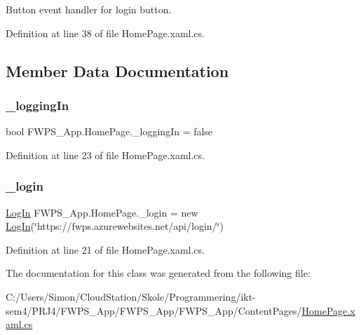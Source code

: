 Button event handler for login button. 



Definition at line 38 of file Home\+Page.\+xaml.\+cs.



\subsection{Member Data Documentation}
\mbox{\label{class_f_w_p_s___app_1_1_home_page_aa4738baf0c1037a3550fe73c0a700610}} 
\subsubsection{\texorpdfstring{\+\_\+logging\+In}{\_loggingIn}}
{\footnotesize\ttfamily bool F\+W\+P\+S\+\_\+\+App.\+Home\+Page.\+\_\+logging\+In = false\hspace{0.3cm}{\ttfamily [private]}}



Definition at line 23 of file Home\+Page.\+xaml.\+cs.

\mbox{\label{class_f_w_p_s___app_1_1_home_page_a8ec7493e61225595cf90149c31da5ef5}} 
\subsubsection{\texorpdfstring{\+\_\+login}{\_login}}
{\footnotesize\ttfamily \mbox{\hyperlink{class_f_w_p_s___app_1_1_log_in}{Log\+In}} F\+W\+P\+S\+\_\+\+App.\+Home\+Page.\+\_\+login = new \mbox{\hyperlink{class_f_w_p_s___app_1_1_log_in}{Log\+In}}(\char`\"{}https\+://fwps.\+azurewebsites.\+net/api/login/\char`\"{})\hspace{0.3cm}{\ttfamily [private]}}



Definition at line 21 of file Home\+Page.\+xaml.\+cs.



The documentation for this class was generated from the following file\+:\begin{DoxyCompactItemize}
\item 
C\+:/\+Users/\+Simon/\+Cloud\+Station/\+Skole/\+Programmering/ikt-\/sem4/\+P\+R\+J4/\+F\+W\+P\+S\+\_\+\+App/\+F\+W\+P\+S\+\_\+\+App/\+F\+W\+P\+S\+\_\+\+App/\+Content\+Pages/\mbox{\hyperlink{_home_page_8xaml_8cs}{Home\+Page.\+xaml.\+cs}}\end{DoxyCompactItemize}
